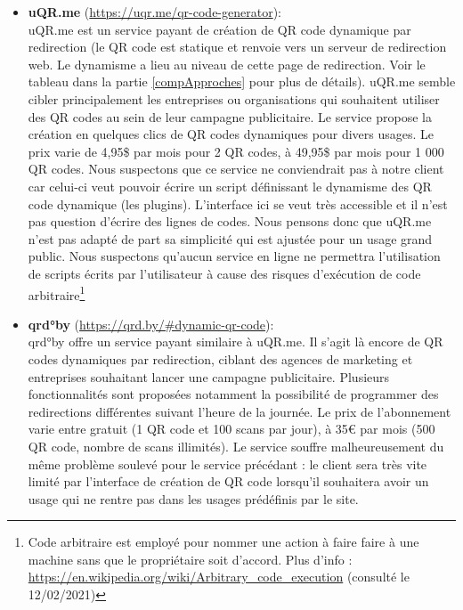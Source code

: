 \documentclass[a4paper,12pt]{article}
\begin{document}
\begin{itemize}

    \item \textbf{uQR.me} (\url{https://uqr.me/qr-code-generator}):\\
    uQR.me est un service payant de création de QR code dynamique par redirection (le QR code est statique et renvoie vers un serveur de redirection web. Le dynamisme a lieu au niveau de cette page de redirection. Voir le tableau dans la partie \ref{compApproches} pour plus de détails). uQR.me semble cibler principalement les entreprises ou organisations qui souhaitent utiliser des QR codes au sein de leur campagne publicitaire. Le service propose la création en quelques clics de QR codes dynamiques pour divers usages. Le prix varie de 4,95\$ par mois pour 2 QR codes, à 49,95\$ par mois pour 1 000 QR codes. Nous suspectons que ce service ne conviendrait pas à notre client car celui-ci veut pouvoir écrire un script définissant le dynamisme des QR code dynamique (les plugins). L'interface ici se veut très accessible et il n'est pas question d'écrire des lignes de codes. Nous pensons donc que uQR.me n'est pas adapté de part sa simplicité qui est ajustée pour un usage grand public. Nous suspectons qu'aucun service en ligne ne permettra l'utilisation de scripts écrits par l'utilisateur à cause des risques d'exécution de code arbitraire\footnote{Code arbitraire est employé pour nommer une action à faire faire à une machine sans que le propriétaire soit d'accord. Plus d'info : \url{https://en.wikipedia.org/wiki/Arbitrary\_code\_execution} (consulté le 12/02/2021)}\\
    
    \item \textbf{qrd°by} (\url{https://qrd.by/#dynamic-qr-code}):\\
    qrd°by offre un service payant similaire à uQR.me. Il s'agit là encore de QR codes dynamiques par redirection, ciblant des agences de marketing et entreprises souhaitant lancer une campagne publicitaire. Plusieurs fonctionnalités sont proposées notamment la possibilité de programmer des redirections différentes suivant l'heure de la journée. Le prix de l'abonnement varie entre gratuit (1 QR code et 100 scans par jour), à 35€ par mois (500 QR code, nombre de scans illimités). Le service souffre malheureusement du même problème soulevé pour le service précédant : le client sera très vite limité par l'interface de création de QR code lorsqu'il souhaitera avoir un usage qui ne rentre pas dans les usages prédéfinis par le site.\\
    

\end{itemize}
\end{document}
